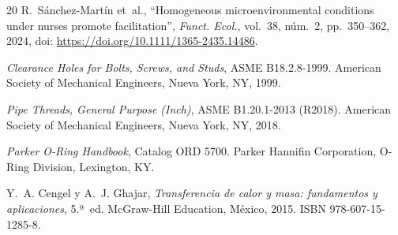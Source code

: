 \begin{thebibliography}{20}
R.~Sánchez-Martín et~al., ``Homogeneous microenvironmental conditions under nurses promote facilitation'', \textit{Funct. Ecol.}, vol.~38, núm.~2, pp.~350--362, 2024, doi: \url{https://doi.org/10.1111/1365-2435.14486}.

\textit{Clearance Holes for Bolts, Screws, and Studs}, ASME B18.2.8-1999. American Society of Mechanical Engineers, Nueva York, NY, 1999.

\textit{Pipe Threads, General Purpose (Inch)}, ASME B1.20.1-2013 (R2018). American Society of Mechanical Engineers, Nueva York, NY, 2018.

\textit{Parker O-Ring Handbook}, Catalog ORD 5700. Parker Hannifin Corporation, O-Ring Division, Lexington, KY.

Y.~A. Cengel y A.~J. Ghajar, \textit{Transferencia de calor y masa: fundamentos y aplicaciones}, 5.ª~ed. McGraw-Hill Education, México, 2015. ISBN 978-607-15-1285-8.

\end{thebibliography}
